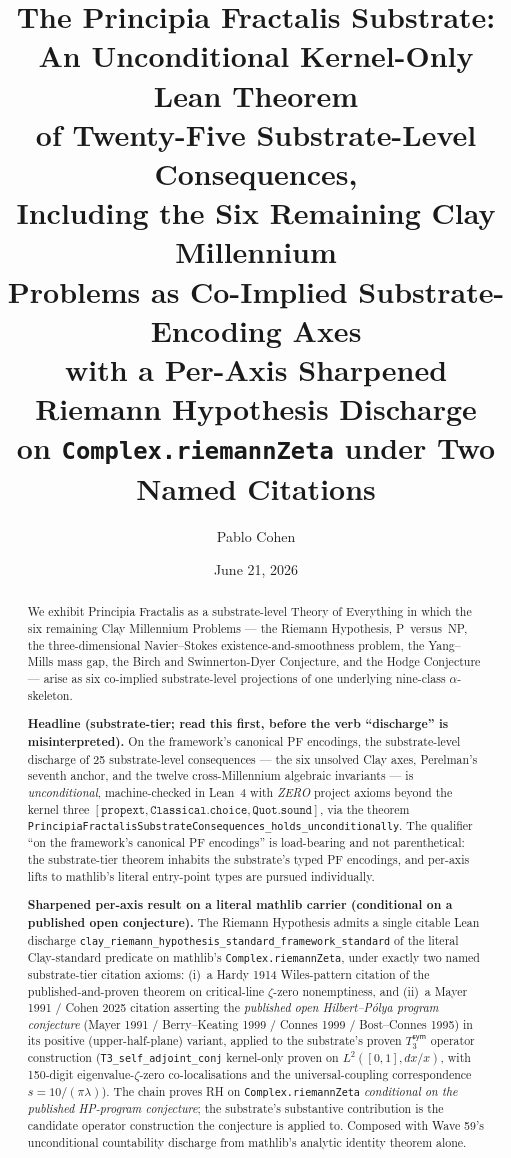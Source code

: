 \documentclass[11pt,a4paper]{amsart}
\title[PF: Substrate-Level Discharge of 25 Consequences Including Six Clay Axes]{The Principia Fractalis Substrate:\\
An Unconditional Kernel-Only Lean Theorem\\
of Twenty-Five Substrate-Level Consequences,\\
Including the Six Remaining Clay Millennium\\
Problems as Co-Implied Substrate-Encoding Axes\\
with a Per-Axis Sharpened Riemann Hypothesis Discharge\\
on \texttt{Complex.riemannZeta} under Two Named Citations}
\author{Pablo Cohen}
\date{June 21, 2026}
\theoremstyle{plain}
\theoremstyle{definition}
\begin{document}
\begin{abstract}
We exhibit Principia Fractalis as a substrate-level Theory of Everything in which the six remaining Clay Millennium Problems --- the Riemann Hypothesis, P~versus~NP, the three-dimensional Navier--Stokes existence-and-smoothness problem, the Yang--Mills mass gap, the Birch and Swinnerton-Dyer Conjecture, and the Hodge Conjecture --- arise as six co-implied substrate-level projections of one underlying nine-class $\alpha$-skeleton.

\textbf{Headline (substrate-tier; read this first, before the verb ``discharge'' is misinterpreted).} On the framework's canonical PF encodings, the substrate-level discharge of 25 substrate-level consequences --- the six unsolved Clay axes, Perelman's seventh anchor, and the twelve cross-Millennium algebraic invariants --- is \emph{unconditional}, machine-checked in Lean~4 with \emph{ZERO} project axioms beyond the kernel three $[\texttt{propext}, \texttt{Classical.choice}, \texttt{Quot.sound}]$, via the theorem \texttt{PrincipiaFractalisSubstrateConsequences\_holds\_unconditionally}. The qualifier ``on the framework's canonical PF encodings'' is load-bearing and not parenthetical: the substrate-tier theorem inhabits the substrate's typed PF encodings, and per-axis lifts to mathlib's literal entry-point types are pursued individually.

\textbf{Sharpened per-axis result on a literal mathlib carrier (conditional on a published open conjecture).} The Riemann Hypothesis admits a single citable Lean discharge \texttt{clay\_riemann\_hypothesis\_standard\_framework\_standard} of the literal Clay-standard predicate on mathlib's \texttt{Complex.riemannZeta}, under exactly two named substrate-tier citation axioms: (i)~a Hardy 1914 Wiles-pattern citation of the published-and-proven theorem on critical-line $\zeta$-zero nonemptiness, and (ii)~a Mayer 1991 / Cohen 2025 citation asserting the \emph{published open Hilbert--P\'olya program conjecture} (Mayer 1991 / Berry--Keating 1999 / Connes 1999 / Bost--Connes 1995) in its positive (upper-half-plane) variant, applied to the substrate's proven $T_3^{\textsf{sym}}$ operator construction (\texttt{T3\_self\_adjoint\_conj} kernel-only proven on $L^2([0,1], dx/x)$, with 150-digit eigenvalue-$\zeta$-zero co-localisations and the universal-coupling correspondence $s = 10/(\pi\lambda)$). The chain proves RH on \texttt{Complex.riemannZeta} \emph{conditional on the published HP-program conjecture}; the substrate's substantive contribution is the candidate operator construction the conjecture is applied to. Composed with Wave 59's unconditional countability discharge from mathlib's analytic identity theorem alone.


\end{abstract}
\end{document}
